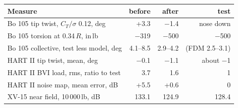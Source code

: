 \begin{tabular}{@{}lrrr@{}}
\toprule
Measure & before & after & test \\
\midrule
Bo 105 tip twist, $C_T/\sigma$ 0.12, deg & +3.3 & $-$1.4 & nose down \\
Bo 105 torsion at 0.34\,$R$, in\,lb & $-$319 & $-$500 & $-$500 \\
Bo 105 collective, test less model, deg & 4.1--8.5 & 2.9--4.2 & (FDM 2.5--3.1) \\
HART II tip twist, mean, deg & $-$0.1 & $-$1.1 & about $-$1 \\
HART II BVI load, rms, ratio to test & 3.7 & 1.6 & 1 \\
HART II noise map, mean error, dB & +5.5 & +0.6 & 0 \\
XV-15 near field, 10\,000\,lb, dB & 133.1 & 124.9 & 128.4 \\
\bottomrule
\end{tabular}
